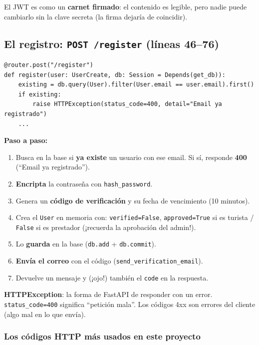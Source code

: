 \documentclass[11pt,a4paper]{article}
\begin{document}
El JWT es como un \textbf{carnet firmado}: el contenido es legible, pero nadie puede
cambiarlo sin la clave secreta (la firma dejaría de coincidir).

\subsection{El registro: \texttt{POST /register} (líneas 46--76)}

\begin{lstlisting}
@router.post("/register")
def register(user: UserCreate, db: Session = Depends(get_db)):
    existing = db.query(User).filter(User.email == user.email).first()
    if existing:
        raise HTTPException(status_code=400, detail="Email ya registrado")
    ...
\end{lstlisting}

\textbf{Paso a paso:}
\begin{enumerate}
    \item Busca en la base si \textbf{ya existe} un usuario con ese email. Si sí,
    responde \textbf{400} (``Email ya registrado'').
    \item \textbf{Encripta} la contraseña con \texttt{hash\_password}.
    \item Genera un \textbf{código de verificación} y su fecha de vencimiento (10 minutos).
    \item Crea el \texttt{User} en memoria con: \texttt{verified=False},
    \texttt{approved=True} si es turista / \texttt{False} si es prestador (¡recuerda la
    aprobación del admin!).
    \item Lo \textbf{guarda} en la base (\texttt{db.add} + \texttt{db.commit}).
    \item \textbf{Envía el correo} con el código (\texttt{send\_verification\_email}).
    \item Devuelve un mensaje y (¡ojo!) también el \texttt{code} en la respuesta.
\end{enumerate}

\textbf{HTTPException}: la forma de FastAPI de responder con un error. \texttt{status\_code=400}
significa ``petición mala''. Los códigos 4xx son errores del cliente (algo mal en lo que envía).

\subsubsection{Los códigos HTTP más usados en este proyecto}
\end{document}
